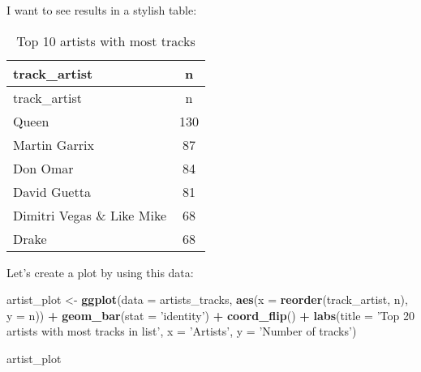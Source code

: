 \documentclass[]{article}
\newenvironment{Shaded}{\begin{snugshade}}{\end{snugshade}}
\newcommand{\DataTypeTok}[1]{\textcolor[rgb]{0.13,0.29,0.53}{#1}}
\newcommand{\DecValTok}[1]{\textcolor[rgb]{0.00,0.00,0.81}{#1}}
\newcommand{\KeywordTok}[1]{\textcolor[rgb]{0.13,0.29,0.53}{\textbf{#1}}}
\newcommand{\NormalTok}[1]{#1}
\newcommand{\OperatorTok}[1]{\textcolor[rgb]{0.81,0.36,0.00}{\textbf{#1}}}
\newcommand{\OtherTok}[1]{\textcolor[rgb]{0.56,0.35,0.01}{#1}}
\newcommand{\StringTok}[1]{\textcolor[rgb]{0.31,0.60,0.02}{#1}}
\begin{document}
\begin{Shaded}
\end{Shaded}

I want to see results in a stylish table:

\begin{Shaded}
\end{Shaded}

\begin{longtable}[]{@{}lc@{}}
\caption{Top 10 artists with most tracks}\tabularnewline
\toprule
track\_artist & n\tabularnewline
\midrule
\endfirsthead
\toprule
track\_artist & n\tabularnewline
\midrule
\endhead
Queen & 130\tabularnewline
Martin Garrix & 87\tabularnewline
Don Omar & 84\tabularnewline
David Guetta & 81\tabularnewline
Dimitri Vegas \& Like Mike & 68\tabularnewline
Drake & 68\tabularnewline
\bottomrule
\end{longtable}

Let's create a plot by using this data:

\begin{Shaded}
\begin{Highlighting}[]
\NormalTok{artist_plot <-}\StringTok{ }\KeywordTok{ggplot}\NormalTok{(}\DataTypeTok{data =}\NormalTok{ artists_tracks, }\KeywordTok{aes}\NormalTok{(}\DataTypeTok{x =} \KeywordTok{reorder}\NormalTok{(track_artist, n), }\DataTypeTok{y =}\NormalTok{ n)) }\OperatorTok{+}
\StringTok{  }\KeywordTok{geom_bar}\NormalTok{(}\DataTypeTok{stat =} \StringTok{'identity'}\NormalTok{) }\OperatorTok{+}
\StringTok{  }\KeywordTok{coord_flip}\NormalTok{() }\OperatorTok{+}
\StringTok{  }\KeywordTok{labs}\NormalTok{(}\DataTypeTok{title =} \StringTok{'Top 20 artists with most tracks in list'}\NormalTok{, }
       \DataTypeTok{x =} \StringTok{'Artists'}\NormalTok{, }
       \DataTypeTok{y =} \StringTok{'Number of tracks'}\NormalTok{)}

\NormalTok{artist_plot}
\end{Highlighting}
\end{Shaded}
\end{document}
